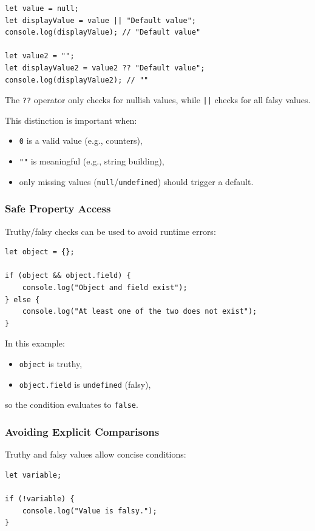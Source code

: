 \documentclass{scrbook}
\begin{document}
\begin{lstlisting}
let value = null;
let displayValue = value || "Default value";
console.log(displayValue); // "Default value"

let value2 = "";
let displayValue2 = value2 ?? "Default value";
console.log(displayValue2); // ""
\end{lstlisting}

The \texttt{??} operator only checks for nullish values, while \texttt{||} checks for all falsy values.

This distinction is important when:
\begin{itemize}
    \item \texttt{0} is a valid value (e.g., counters),
    \item \texttt{""} is meaningful (e.g., string building),
    \item only missing values (\texttt{null}/\texttt{undefined}) should trigger a default.
\end{itemize}

\subsubsection{Safe Property Access}

Truthy/falsy checks can be used to avoid runtime errors:

\begin{lstlisting}
let object = {};

if (object && object.field) {
    console.log("Object and field exist");
} else {
    console.log("At least one of the two does not exist");
}
\end{lstlisting}

In this example:
\begin{itemize}
    \item \texttt{object} is truthy,
    \item \texttt{object.field} is \texttt{undefined} (falsy),
\end{itemize}

so the condition evaluates to \texttt{false}.

\subsubsection{Avoiding Explicit Comparisons}

Truthy and falsy values allow concise conditions:

\begin{lstlisting}
let variable;

if (!variable) {
    console.log("Value is falsy.");
}
\end{lstlisting}
\end{document}
